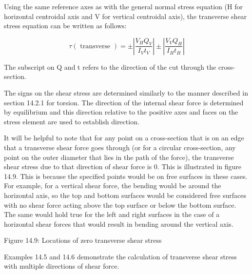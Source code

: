 \documentclass[
  letterpaper,
  DIV=11,
  numbers=noendperiod]{scrreprt}
\begin{document}
Using the same reference axes as with the general normal stress equation
(H for horizontal centroidal axis and V for vertical centroidal axis),
the transverse shear stress equation can be written as follows:

\[
\tau(\text { transverse })= \pm\left|\frac{V_H Q_V}{I_V t_V}\right| \pm\left|\frac{V_V Q_H}{I_H t_H}\right|
\]

The subscript on Q and t refers to the direction of the cut through the
cross-section.

The signs on the shear stress are determined similarly to the manner
described in section 14.2.1 for torsion. The direction of the internal
shear force is determined by equilibrium and this direction relative to
the positive axes and faces on the stress element are used to establish
direction.

It will be helpful to note that for any point on a cross-section that is
on an edge that a transverse shear force goes through (or for a circular
cross-section, any point on the outer diameter that lies in the path of
the force), the transverse shear stress due to that direction of shear
force is 0. This is illustrated in figure 14.9. This is because the
specified points would be on free surfaces in these cases. For example,
for a vertical shear force, the bending would be around the horizontal
axis, so the top and bottom surfaces would be considered free surfaces
with no shear force acting above the top surface or below the bottom
surface. The same would hold true for the left and right surfaces in the
case of a horizontal shear forces that would result in bending around
the vertical axis.

Figure 14.9: Locations of zero transverse shear stress

Examples 14.5 and 14.6 demonstrate the calculation of transverse shear
stress with multiple directions of shear force.
\end{document}
